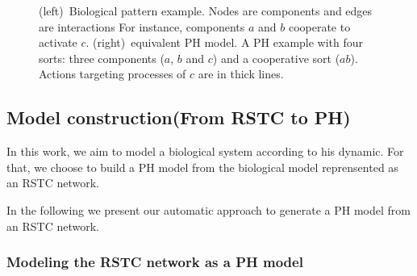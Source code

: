 \begin{example}
\begin{figure}[!t]
\begin{minipage}{0.7\linewidth}
{
}
\end{minipage}

\caption{\label{fig:modelingBRN}
(left)~Biological pattern example.
Nodes are components and edges are interactions
For instance, components $a$ and $b$ cooperate to activate $c$.
(right)~equivalent PH model. \label{fig:runningPH}
A PH example with four sorts: three components ($a$, $b$ and $c$) and a cooperative sort ($ab$).
Actions targeting processes of $c$ are in thick lines.
}
\end{figure}

\end{example}




\subsection{Model construction(From RSTC to PH)}
In this work, we aim to model a biological  system according to his dynamic. For that, we choose to build a PH model from the biological model reprensented as  an RSTC network.

In the following we present our automatic approach to generate a PH model from an RSTC network.


\subsubsection{Modeling the RSTC network as a PH model}

